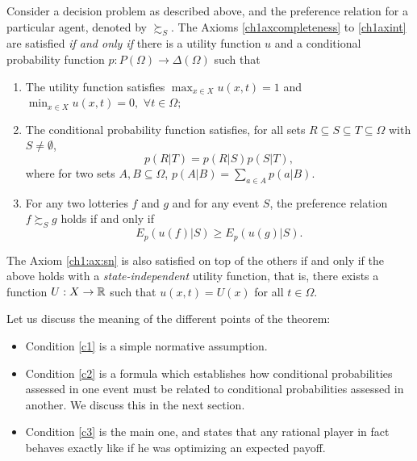 \begin{theorem}
Consider a decision problem as described above, and the preference relation for a particular agent, denoted by $\succsim_S.$
The Axioms \ref{ch1axcompleteness} to \ref{ch1axint}  are satisfied \emph{if and only if} there is a utility function $u$ and a conditional probability function $p : P(\Omega) \rightarrow  \Delta(\Omega)$ such that
\begin{enumerate}
\item The utility function satisfies $\max_{x \in X} u(x,t) = 1$ and $\min_{x \in X} u(x,t) =0,$  $\forall t \in \Omega;$
\label{c1}
\item The conditional probability function satisfies, for all sets $R \subseteq S \subseteq T \subseteq \Omega$ with $S \neq \emptyset$,
\begin{equation}
p(R|T) = p(R|S)p(S|T),
\label{ch1:eq:probaas}
\end{equation}
where for two sets $A, B \subseteq \Omega$, $p(A|B) = \sum_{a \in A}p(a|B).$
\label{c2}
\item For any two lotteries $f$ and $g$ and for any event $S$, the preference relation $f \succsim_S g$ holds if and only if
$$ E_p(u(f) | S) \geq E_p(u(g) | S).$$
\label{c3}
\end{enumerate}
The Axiom \ref{ch1:ax:sn} is also satisfied on top of the others if and only if the above holds with a \emph{state-independent} utility function, that is,
there exists a function $U : X \rightarrow \mathbb{R}$ such that
$u(x,t) = U(x)$ for all $t \in \Omega$.
\label{ch1:utility-maximization}
\end{theorem}


Let us discuss the meaning of the different points of the theorem:
\begin{itemize}
\item Condition \ref{c1} is a simple normative assumption.
\item Condition \ref{c2} is a formula which establishes how conditional probabilities assessed in one event must be related to conditional probabilities assessed in another. We discuss this in the next section.
\item Condition \ref{c3} is the main one, and states that any rational player in fact behaves exactly like if he was optimizing an expected payoff.
\end{itemize}

